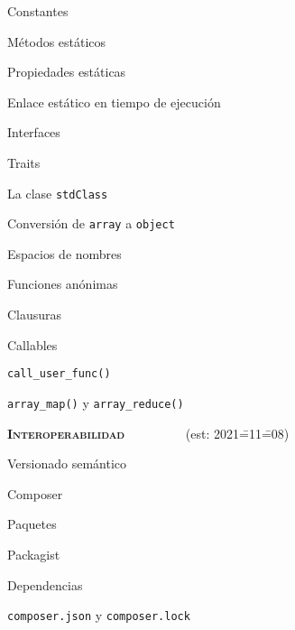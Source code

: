 \begin{longenum}
\begin{longenum}
\begin{longenum}
\begin{longenum}
                \item Constantes
                \item Métodos estáticos
                \item Propiedades estáticas
                \item Enlace estático en tiempo de ejecución
            \end{longenum}
            \item Interfaces
            \item Traits
            \item La clase \texttt{stdClass}
            \begin{longenum}
                \item Conversión de \texttt{array} a \texttt{object}
            \end{longenum}
        \end{longenum}
        \item Espacios de nombres
        \item Funciones anónimas
        \begin{longenum}
            \item Clausuras
        \end{longenum}
        \item Callables
        \begin{longenum}
            \item \texttt{call\_user\_func()}
            \item \texttt{array\_map()} y \texttt{array\_reduce()}
        \end{longenum}
    \end{longenum}
    \item \textbf{\textsc{Interoperabilidad}} \ \ \ \ \ \ \ \ \ (est: 2021\==11\==08)
    \begin{longenum}
        \item Versionado semántico
        \item Composer
        \begin{longenum}
            \item Paquetes
            \item Packagist
            \item Dependencias
            \begin{longenum}
                \item \texttt{composer.json} y \texttt{composer.lock}
            \end{longenum}

\end{longenum}
\end{longenum}
\end{longenum}
